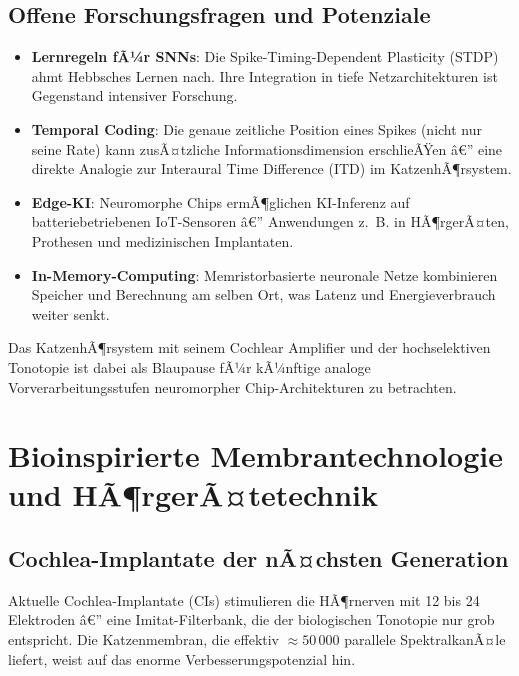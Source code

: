 ﻿\documentclass[12pt,a4paper,titlepage]{report}
\begin{document}
\subsection{Offene Forschungsfragen und Potenziale}

\begin{itemize}[leftmargin=2em]
    \item \textbf{Lernregeln fÃ¼r SNNs}: Die Spike-Timing-Dependent Plasticity (STDP)
        ahmt Hebbsches Lernen nach. Ihre Integration in tiefe Netzarchitekturen
        ist Gegenstand intensiver Forschung.
    \item \textbf{Temporal Coding}: Die genaue zeitliche Position eines Spikes
        (nicht nur seine Rate) kann zusÃ¤tzliche Informationsdimension erschlieÃŸen â€”
        eine direkte Analogie zur Interaural Time Difference (ITD) im KatzenhÃ¶rsystem.
    \item \textbf{Edge-KI}: Neuromorphe Chips ermÃ¶glichen KI-Inferenz auf
        batteriebetriebenen IoT-Sensoren â€” Anwendungen z.~B. in HÃ¶rgerÃ¤ten, Prothesen
        und medizinischen Implantaten.
    \item \textbf{In-Memory-Computing}: Memristorbasierte neuronale Netze kombinieren
        Speicher und Berechnung am selben Ort, was Latenz und Energieverbrauch
        weiter senkt.
\end{itemize}

Das KatzenhÃ¶rsystem mit seinem Cochlear Amplifier und der hochselektiven
Tonotopie ist dabei als Blaupause fÃ¼r kÃ¼nftige analoge Vorverarbeitungsstufen
neuromorpher Chip-Architekturen zu betrachten.

\section{Bioinspirierte Membrantechnologie und HÃ¶rgerÃ¤tetechnik}

\subsection{Cochlea-Implantate der nÃ¤chsten Generation}

Aktuelle Cochlea-Implantate (CIs) stimulieren die HÃ¶rnerven mit 12 bis 24
Elektroden â€” eine Imitat-Filterbank, die der biologischen Tonotopie nur grob entspricht.
Die Katzenmembran, die effektiv $\approx 50\,000$ parallele SpektralkanÃ¤le liefert,
weist auf das enorme Verbesserungspotenzial hin.
\end{document}
